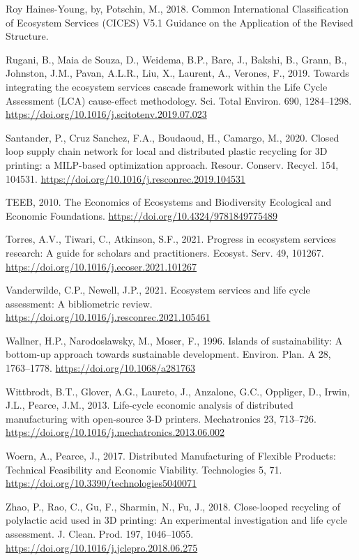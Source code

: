 \documentclass[]{elsarticle} %
\newlength{\cslhangindent}
\newenvironment{CSLReferences}[2] %
 {%
  \setlength{\parindent}{0pt}
  \ifodd #1 \everypar{\setlength{\hangindent}{\cslhangindent}}\ignorespaces\fi
  \ifnum #2 > 0
  \setlength{\parskip}{#2\baselineskip}
  \fi
 }%
 {}
\begin{document}
\begin{CSLReferences}{1}{0}
\leavevmode{}%
Roy Haines-Young, by, Potschin, M., 2018. {Common International Classification of Ecosystem Services (CICES) V5.1 Guidance on the Application of the Revised Structure}.

\leavevmode{}%
Rugani, B., Maia de Souza, D., Weidema, B.P., Bare, J., Bakshi, B., Grann, B., Johnston, J.M., Pavan, A.L.R., Liu, X., Laurent, A., Verones, F., 2019. {Towards integrating the ecosystem services cascade framework within the Life Cycle Assessment (LCA) cause-effect methodology}. Sci. Total Environ. 690, 1284--1298. \url{https://doi.org/10.1016/j.scitotenv.2019.07.023}

\leavevmode{}%
Santander, P., Cruz Sanchez, F.A., Boudaoud, H., Camargo, M., 2020. {Closed loop supply chain network for local and distributed plastic recycling for 3D printing: a MILP-based optimization approach}. Resour. Conserv. Recycl. 154, 104531. \url{https://doi.org/10.1016/j.resconrec.2019.104531}

\leavevmode{}%
TEEB, 2010. {The Economics of Ecosystems and Biodiversity Ecological and Economic Foundations.} \url{https://doi.org/10.4324/9781849775489}

\leavevmode{}%
Torres, A.V., Tiwari, C., Atkinson, S.F., 2021. {Progress in ecosystem services research: A guide for scholars and practitioners}. Ecosyst. Serv. 49, 101267. \url{https://doi.org/10.1016/j.ecoser.2021.101267}

\leavevmode{}%
Vanderwilde, C.P., Newell, J.P., 2021. {Ecosystem services and life cycle assessment: A bibliometric review}. \url{https://doi.org/10.1016/j.resconrec.2021.105461}

\leavevmode{}%
Wallner, H.P., Narodoslawsky, M., Moser, F., 1996. {Islands of sustainability: A bottom-up approach towards sustainable development}. Environ. Plan. A 28, 1763--1778. \url{https://doi.org/10.1068/a281763}

\leavevmode{}%
Wittbrodt, B.T., Glover, A.G., Laureto, J., Anzalone, G.C., Oppliger, D., Irwin, J.L., Pearce, J.M., 2013. {Life-cycle economic analysis of distributed manufacturing with open-source 3-D printers}. Mechatronics 23, 713--726. \url{https://doi.org/10.1016/j.mechatronics.2013.06.002}

\leavevmode{}%
Woern, A., Pearce, J., 2017. {Distributed Manufacturing of Flexible Products: Technical Feasibility and Economic Viability}. Technologies 5, 71. \url{https://doi.org/10.3390/technologies5040071}

\leavevmode{}%
Zhao, P., Rao, C., Gu, F., Sharmin, N., Fu, J., 2018. {Close-looped recycling of polylactic acid used in 3D printing: An experimental investigation and life cycle assessment}. J. Clean. Prod. 197, 1046--1055. \url{https://doi.org/10.1016/j.jclepro.2018.06.275}

\end{CSLReferences}
\end{document}
